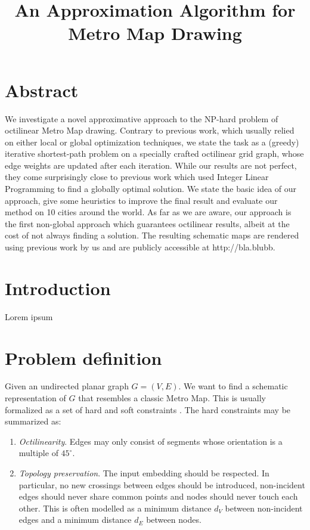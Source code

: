 \documentclass{sig-alternate-sigmod09}
\begin{document}
\title{An Approximation Algorithm for Metro Map Drawing}


\maketitle

\section{Abstract}

We investigate a novel approximative approach to the NP-hard problem of octilinear Metro Map drawing. Contrary to previous work, which usually relied on either local or global optimization techniques, we state the task as a (greedy) iterative shortest-path problem on a specially crafted octilinear grid graph, whose edge weights are updated after each iteration. While our results are not perfect, they come surprisingly close to previous work which used Integer Linear Programming to find a globally optimal solution. We state the basic idea of our approach, give some heuristics to improve the final result and evaluate our method on 10 cities around the world. As far as we are aware, our approach is the first non-global approach which guarantees octilinear results, albeit at the cost of not always finding a solution. The resulting schematic maps are rendered using previous work by us and are publicly accessible at http://bla.blubb. 

\section{Introduction}

Lorem ipsum 

\section{Problem definition}

Given an undirected planar graph $G = (V, E)$. We want to find a schematic representation of $G$ that resembles a classic Metro Map. This is usually formalized as a set of hard and soft constraints \cite{nb, ...}. The hard constraints may be summarized as:

\begin{enumerate}
\setlength\itemsep{.1em}
\item \emph{Octilinearity}. Edges may only consist of segments whose orientation is a multiple of $45^{\circ}$.
\item \emph{Topology preservation}. The input embedding should be respected. In particular, no new crossings between edges should be introduced, non-incident edges should never share common points and nodes should never touch each other. This is often modelled as a minimum distance $d_{V}$ between non-incident edges and a minimum distance $d_{E}$ between nodes.
\end{enumerate}
\end{document}
